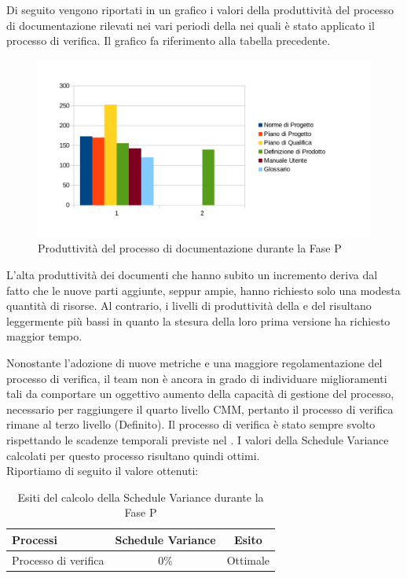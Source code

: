 Di seguito vengono riportati in un grafico i valori della produttività del processo di documentazione rilevati nei vari periodi della  nei quali è stato applicato il processo di verifica. Il grafico fa riferimento alla tabella precedente.\\
\begin{figure}[H]
	\centering
		\includegraphics[width=12cm]{PianoDiQualifica/Pics/ProduttivitaDocumentazioneFaseP.pdf}
	\caption{Produttività del processo di documentazione durante la Fase P}
\end{figure}
L'alta produttività dei documenti che hanno subito un incremento deriva dal fatto che le nuove parti aggiunte, seppur ampie, hanno richiesto solo una modesta quantità di risorse.
Al contrario, i livelli di produttività della  e del  risultano leggermente più bassi in quanto la stesura della loro prima versione ha richiesto maggior tempo.

	Nonostante l'adozione di nuove metriche e una maggiore regolamentazione del processo di verifica, il team non è ancora in grado di individuare miglioramenti tali da comportare un oggettivo aumento della capacità di gestione del processo, necessario per raggiungere il quarto livello CMM, pertanto il processo di verifica rimane al terzo livello (Definito).
	Il processo di verifica è stato sempre svolto rispettando le scadenze temporali previste nel . I valori della Schedule Variance calcolati per questo processo risultano quindi ottimi.\\
			Riportiamo di seguito il valore ottenuti:
			\begin{table}[H]
				\centering
				\begin{tabu}{| l | c | c |}
					\hline
						Processi 							& Schedule Variance	& Esito		\\ \hline \hline
						Processo di verifica & 0\% & Ottimale \\ \hline
				\end{tabu}
				\caption{Esiti del calcolo della Schedule Variance durante la Fase P}
			\end{table}	

